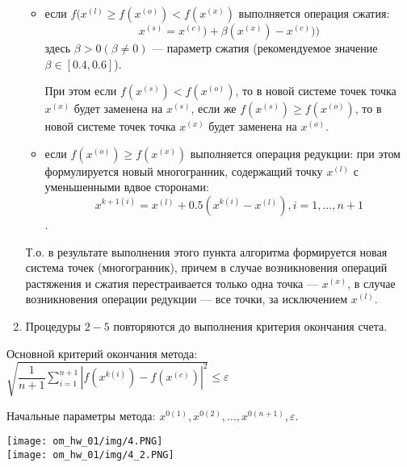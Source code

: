 \begin{enumerate}
\begin{itemize}
\item если $f(x^{(l)} \geq f(x^{(o)})  < f(x^{(x)})$ выполняется операция сжатия:
$$x^{(s)} = x^{(c)}) + \beta (x^{(x)}) - x^{(c)}))$$
здесь $\beta > 0 (\beta \neq 0)$ --- параметр сжатия (рекомендуемое значение $\beta \in [0.4, 0.6]$).

При этом если $f(x^{(s)}) < f(x^{(o)})$, то в новой системе точек точка $x^{(x)}$ будет заменена на $x^{(s)}$, если же $f(x^{(s)}) \geq f(x^{(o)})$, то в новой системе точек точка $x^{(x)}$ будет заменена на $x^{(o)}$.

\item если $f(x^{(o)}) \geq f(x^{(x)})$ выполняется операция редукции: при этом формулируется новый многогранник, содержащий точку $x^{(l)}$ с уменьшенными вдвое сторонами:
$$ x^{k+1(i)} = x^{(l)} + 0.5 (x^{k(i)} - x^{(l)}), i = 1, \ldots, n + 1$$.
\end{itemize}

Т.о. в результате выполнения этого пункта алгоритма формируется новая система точек (многогранник), причем в случае возникновения операций растяжения и сжатия перестраивается только одна точка --- $x^{(x)}$, в случае возникновения операции редукции --- все точки, за исключением $x^{(l)}$.

\item Процедуры $2 - 5$ повторяются до выполнения критерия окончания счета.
\end{enumerate}

Основной критерий окончания метода: $\sqrt{\dfrac{1}{n + 1} \sum_{i = 1}^{n + 1} |f(x^{k(i)}) - f(x^{(c)})|^{2}} \leq \varepsilon$

Начальные параметры метода: $x^{0(1)}, x^{0(2)}, \ldots, x^{0(n+1)}, \varepsilon $.

\texttt{[image: om\_hw\_01/img/4.PNG]}\\
\texttt{[image: om\_hw\_01/img/4\_2.PNG]}\\

\pagebreak